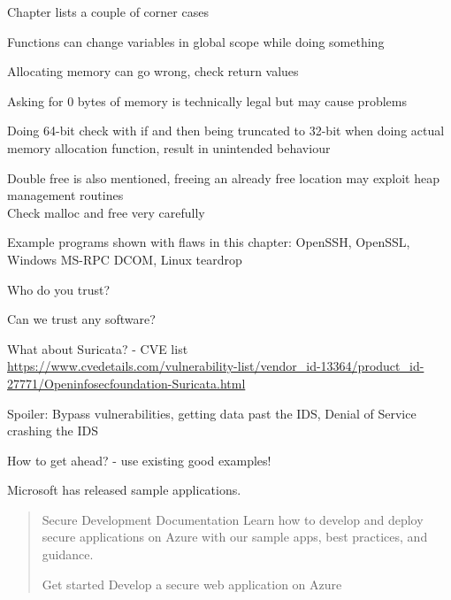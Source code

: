 \documentclass[Screen16to9,17pt]{foils}
\begin{document}

\begin{list2}
\item Chapter lists a couple of corner cases
\item Functions can change variables in global scope while doing something
\item Allocating memory can go wrong, check return values
\item Asking for 0 bytes of memory is technically legal but may cause problems
\item Doing 64-bit check with if and then being truncated to 32-bit when doing actual memory allocation function, result in unintended behaviour
\item Double free is also mentioned, freeing an already free location may exploit heap management routines\\
Check malloc and free very carefully
\end{list2}




\begin{list2}
\item Example programs shown with flaws in this chapter: OpenSSH, OpenSSL, Windows MS-RPC DCOM, Linux teardrop
\item Who do you trust?
\item Can we trust any software?

\item What about Suricata? - CVE list\\
{\footnotesize\url{https://www.cvedetails.com/vulnerability-list/vendor_id-13364/product_id-27771/Openinfosecfoundation-Suricata.html}}
\item Spoiler: Bypass vulnerabilities, getting data past the IDS, Denial of Service crashing the IDS
\end{list2}



How to get ahead? - use existing good examples!

Microsoft has released sample applications.

\begin{quote}
Secure Development Documentation
Learn how to develop and deploy secure applications on Azure with our sample apps, best practices, and guidance.

Get started
Develop a secure web application on Azure
\end{quote}
\end{document}
